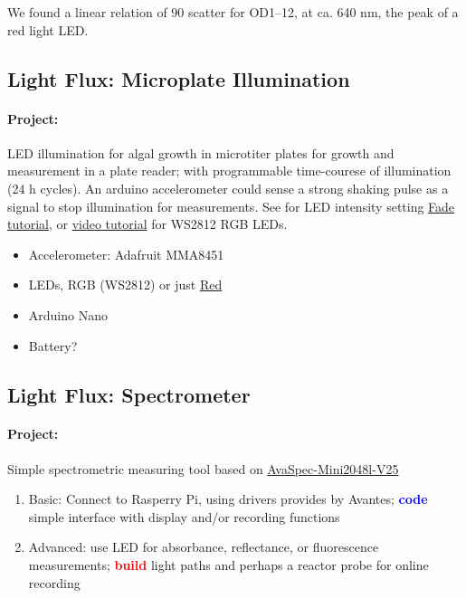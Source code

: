 \documentclass[12pt,a4paper]{scrartcl}
\newcommand{\build}[0]{\textcolor{red}{\textbf{build}}}
\newcommand{\code}[0]{\textcolor{blue}{\textbf{code}}}
\begin{document}
We found a linear relation of 90\textdegree{} scatter for OD1--12,
at ca. 640 nm, the peak of a red light LED.


\clearpage
\subsection{Light Flux: Microplate Illumination} 
\label{led}

\paragraph{Project:} LED illumination for algal growth in microtiter plates for
growth and measurement in a plate reader; with programmable
time-courese of illumination (24 h cycles). An arduino accelerometer
could sense a strong shaking pulse as a signal to stop illumination
for measurements. See for LED intensity setting \href{
  https://www.arduino.cc/en/Tutorial/Fade}{Fade tutorial}, or
\href{https://www.youtube.com/watch?v=PNQ8R1Ptvs4}{video tutorial} for
WS2812 RGB LEDs.

\begin{itemize}
\item Accelerometer: Adafruit MMA8451
\item LEDs, RGB (WS2812) or just \href{http://www.produktinfo.conrad.com/datenblaetter/175000-199999/180105-da-01-en-LED_0805_TYP_KP_2012SRC_PRV.pdf}{Red}
\item Arduino Nano
\item Battery?
\end{itemize}


\clearpage
\subsection{Light Flux: Spectrometer} 
\label{spec}
\paragraph{Project:} 
Simple spectrometric measuring tool based on
\href{http://www.avantes.com/products/spectrometers/compactline/item/723-avaspec-mini}{AvaSpec-Mini2048l-V25}

\begin{enumerate}
\item Basic: Connect to Rasperry Pi, using drivers provides by
  Avantes; \code{} simple interface with display and/or recording
  functions
\item Advanced: use LED for absorbance, reflectance, or fluorescence
  measurements; \build{} light paths and perhaps a reactor probe for
  online recording
\end{enumerate}
\end{document}
